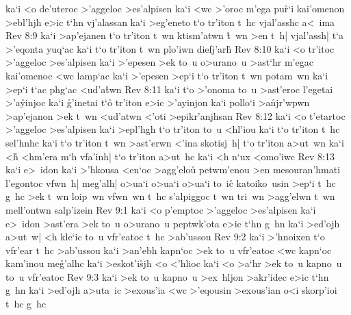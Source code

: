 ka`i
<o
de'uteroc
>'aggeloc
>es'alpisen
ka`i
<wc
>'oroc
m'ega
pu\r{r}`i
kai'omenon
>ebl'hjh
e>ic
t`hn
vj'alassan
ka`i
>eg'eneto
t`o
tr'iton
t~hc
vjal'asshc
a<~ima\bibvsend
\vs Rev 8:9
ka`i
>ap'ejanen
t`o
tr'iton
t~wn
ktism'atwn
\r{t}~wn
>en
t~h|
vjal'assh|
t`a
>'eqonta
yuq`ac
ka`i
t`o
tr'iton
t~wn
plo'iwn
diefj'ar\r{h}\bibvsend
{}
\vs Rev 8:10
ka`i
<o
tr'itoc
>'aggeloc
>es'alpisen
ka`i
>'epesen
>ek
to~u
o>urano~u
>ast`hr
m'egac
kai'omenoc
<wc
lamp`ac
ka`i
>'epesen
>ep`i
t`o
tr'iton
t~wn
potam~wn
ka`i
>ep`i
t`ac
phg`ac
<ud'a\r{t}wn\bibvsend
{}
\vs Rev 8:11
ka`i
t`o
>'onoma
to~u
>ast'eroc
l'egetai
>'a\r{y}injoc
ka`i
\r{g}'inetai
t`o\r{}
tr'iton
e>ic
>'ayinjon
ka`i
pollo`i
>a\r{n}jr'wpwn
>ap'ejanon
>ek
t~wn
<ud'atwn
<'oti
>epikr'anjhsan\bibvsend
\vs Rev 8:12
ka`i
<o
t'etartoc
>'aggeloc
>es'alpisen
ka`i
>epl'hgh
t`o
tr'iton
to~u
<hl'iou
ka`i
t`o
tr'iton
t~hc
sel'hnhc
ka`i
t`o
tr'iton
t~wn
>ast'erwn
<'ina
skotisj~h|
t`o
tr'iton
a>ut~wn
ka`i
<h\r{}
<hm'era
m`h
vfa'inh|
t`o
tr'iton
a>ut~hc
ka`i
<h
n`ux
<omo'iwc\bibvsend
\vs Rev 8:13
ka`i
e>~idon
ka`i
>'hkousa
<en`oc
>agg'elou\r{}
petwm'enou
>en
mesouran'hmati
l'egontoc
vfwn~h|
meg'alh|
o>ua`i
o>ua`i
o>ua`i
to~ic\r{}
katoiko~usin
>ep`i
t~hc
g~hc
>ek
t~wn
loip~wn
vfwn~wn
t~hc
s'alpiggoc
t~wn
tri~wn
>agg'elwn
t~wn
mell'ontwn
salp'izein\bibvsend
\vs Rev 9:1
ka`i
<o
p'emptoc
>'aggeloc
>es'alpisen
ka`i
e>~idon
>ast'era
>ek
to~u
o>urano~u
peptwk'ota
e>ic
t`hn
g~hn
ka`i
>ed'ojh
a>ut~w|
<h
kle`ic
to~u
vfr'eatoc
t~hc
>ab'ussou\bibvsend
\vs Rev 9:2
ka`i
>'hnoixen
t`o
vfr'ear
t~hc
>ab'ussou
ka`i
>an'ebh
kapn`oc
>ek
to~u
vfr'eatoc
<wc
kapn`oc
kam'inou
me\r{g}'alhc
ka`i
>eskot'i\r{s}jh
<o
<'hlioc
ka`i
<o
>a`hr
>ek
to~u
kapno~u
to~u
vfr'eatoc\bibvsend
\vs Rev 9:3
ka`i
>ek
to~u
kapno~u
>ex~hljon
>akr'idec
e>ic
t`hn
g~hn
ka`i
>ed'ojh
a>uta~ic
>exous'ia
<wc
>'eqousin
>exous'ian
o<i
skorp'ioi
t~hc
g~hc\bibvsend
